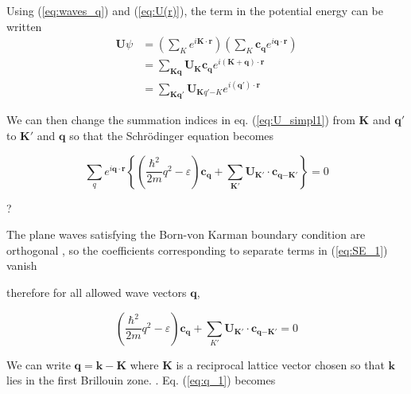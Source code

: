 	Using (\ref{eq:waves_q}) and (\ref{eq:U(r)}), the term in the potential energy can be written 
	\begin{align} \label{eq:U_simpl1}
		\mathbf{U} \psi
		&=
		\left( \sum_{K}
		e^{i \mathbf{K} \cdot \mathbf{r}} \right)
		\left( \sum_{K} \mathbf{c_q}
		e^{i \mathbf{q} \cdot \mathbf{r}} \right) \\ \nonumber
		&=		
		\sum_{\mathbf{Kq}}
		\mathbf{U_Kc_q}
		e^{i(\mathbf{K+q}) \cdot \mathbf{r}} \\
		&=
		\sum_{\mathbf{Kq'}}
		\boldsymbol{U}_{{\mathbf{K}{q' {-K}}}}
		e^{i(\mathbf{q'}) \cdot \mathbf{r}}
	\end{align}


	We can then change the summation indices in eq. (\ref{eq:U_simpl1}) from $\mathbf{K}$ and $\mathbf{q'}$ to $\mathbf{K'}$ and $\mathbf{q}$ so that the Schrödinger equation becomes

	\begin{equation} \label{eq:SE_1}
		\sum_{q} e^{i\mathbf{q}\cdot\mathbf{r}}
		\left\{
		\left(
		\frac{\hbar^2}{2m} q^2 - \varepsilon
		\right) \boldsymbol{c}_{\mathbf{q}}
		+ \sum_{\mathbf{K'}} \boldsymbol{U}_{\mathbf{K'}}
		\cdot \boldsymbol{c}_\mathbf{q {-K'}}
		\right\}
		= 0
	\end{equation}

	?

	The plane waves satisfying the Born-von Karman boundary condition are orthogonal , so the coefficients corresponding to separate terms in (\ref{eq:SE_1}) vanish 

	therefore for all allowed wave vectors $\mathbf{q}$,

	\begin{equation} \label{eq:q_1}
		\left(
		\frac{\hbar^2}{2m} q^2
		- \varepsilon
		\right) \boldsymbol{c}_{\mathbf{q}}
		+ \sum_{K'} \boldsymbol{U}_\mathbf{K'}
		\cdot \boldsymbol{c}_\mathbf{q{-K'}}
		= 0
	\end{equation}

	We can write $\mathbf{q=k-K}$ where $\mathbf{K}$ is a reciprocal lattice vector chosen so that $\mathbf{k}$ lies in the first Brillouin zone. . Eq. (\ref{eq:q_1}) becomes

